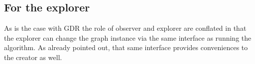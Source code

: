 \subsection{For the explorer}
\label{sec:explorer}

As is the case with GDR the role of observer and explorer are conflated in that
the explorer can change the graph instance via the same interface as running the
algorithm. As already pointed out, that same interface provides conveniences
to the creator as well.


